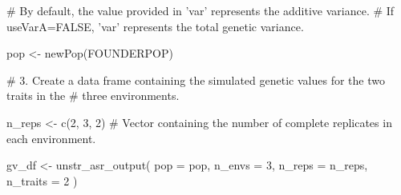 \documentclass[a4paper]{book}
\begin{document}
\begin{Examples}
\begin{ExampleCode}
# By default, the value provided in 'var' represents the additive variance.
# If useVarA=FALSE, 'var' represents the total genetic variance.

pop <- newPop(FOUNDERPOP)


# 3. Create a data frame containing the simulated genetic values for the two traits in the
# three environments.

n_reps <- c(2, 3, 2) # Vector containing the number of complete replicates in each environment.

gv_df <- unstr_asr_output(
  pop = pop,
  n_envs = 3,
  n_reps = n_reps,
  n_traits = 2
)
\end{ExampleCode}
\end{Examples}
\printindex{}
\end{document}
